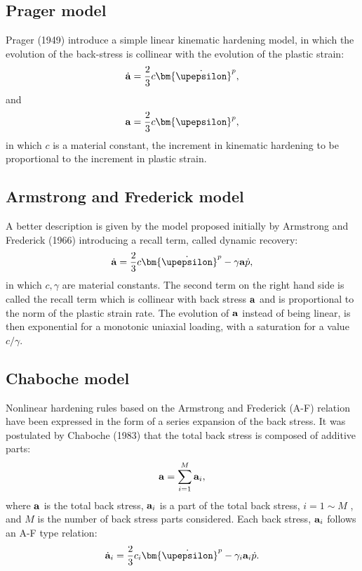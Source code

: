 \subsection{Prager model}
Prager (1949) \cite{prager1949recent} introduce a simple linear kinematic hardening model, in which the evolution of the back-stress is collinear with the evolution of the plastic strain:
\begin{equation}
{\dot{\bf a}} = \frac{2}{3}c{\bm{\dot \upepsilon }}_{}^p,
\end{equation}
and
\begin{equation}
{\bf{ a}} = \frac{2}{3}c{\bm{ \upepsilon }}_{}^p,
\end{equation}
in which $c$ is a material constant, the increment in kinematic hardening to be proportional to the increment
in plastic strain.
\subsection{Armstrong and Frederick model}
A better description is given by the model proposed initially by Armstrong and Frederick (1966) \cite{armstrong1966mathematical} introducing a recall term, called dynamic recovery:
\begin{equation}
{\dot {\bf a}} = \frac{2}{3}c{\bm{\dot \upepsilon }}_{}^p - \gamma {\bf{a}}\dot p,
\end{equation}
in which $c,\gamma$ are material constants.
The second term on the right hand side is called the recall term which is collinear with back stress $\bf{a}$ and is proportional to the norm of the plastic strain rate. The evolution of $\bf{a}$ instead of being linear, is then exponential for a monotonic uniaxial loading, with a saturation for a value $c/\gamma $.
\subsection{Chaboche model}
Nonlinear hardening rules based on the Armstrong and Frederick (A-F) relation have been expressed in the form of a series expansion of the back stress.
It was postulated by Chaboche (1983) \cite{chaboche1983plastic} that the total back stress is composed of additive parts:
\begin{equation}
{\bf{a}} = \sum\limits_{i = 1}^M {{{\bf{a}}_i}},
\end{equation}
where ${\bf{a}}$ is the total back stress, ${{{\bf{a}}_i}}$ is a part of the total back stress, $i = 1\sim M$ , and $M$ is the number of back stress parts considered. Each back stress, ${{{\bf{a}}_i}}$ follows an A-F type relation:
\begin{equation}
{{\dot{\bf a}}_i} = \frac{2}{3}{c_i}{{\bm{\dot \upepsilon }}^p} - {\gamma _i}{{\bf{a}}_i}\dot p.
\end{equation}


